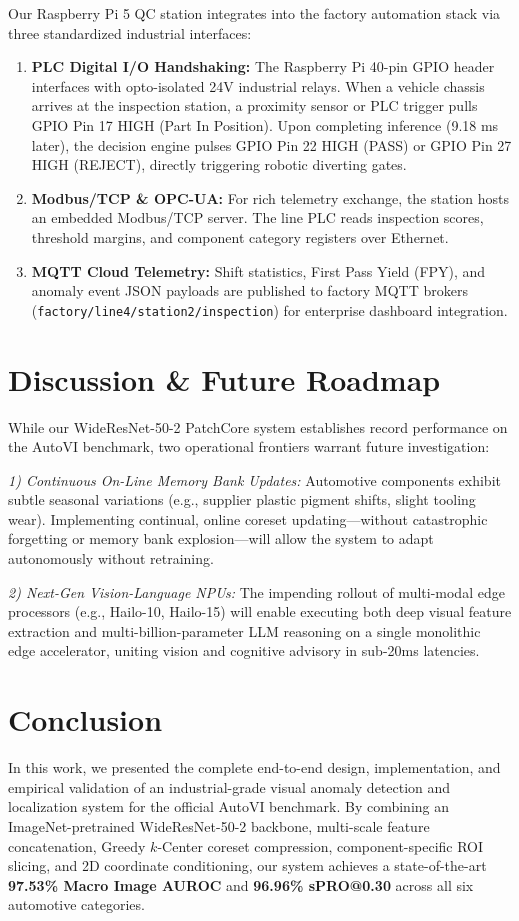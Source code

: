 \documentclass[journal,twocolumn]{IEEEtran}
\begin{document}
Our Raspberry Pi 5 QC station integrates into the factory automation stack via three standardized industrial interfaces:
\begin{enumerate}
    \item \textbf{PLC Digital I/O Handshaking:} The Raspberry Pi 40-pin GPIO header interfaces with opto-isolated 24V industrial relays. When a vehicle chassis arrives at the inspection station, a proximity sensor or PLC trigger pulls GPIO Pin 17 HIGH (Part In Position). Upon completing inference (9.18 ms later), the decision engine pulses GPIO Pin 22 HIGH (PASS) or GPIO Pin 27 HIGH (REJECT), directly triggering robotic diverting gates.
    \item \textbf{Modbus/TCP \& OPC-UA:} For rich telemetry exchange, the station hosts an embedded Modbus/TCP server. The line PLC reads inspection scores, threshold margins, and component category registers over Ethernet.
    \item \textbf{MQTT Cloud Telemetry:} Shift statistics, First Pass Yield (FPY), and anomaly event JSON payloads are published to factory MQTT brokers (\texttt{factory/line4/station2/inspection}) for enterprise dashboard integration.
\end{enumerate}

\section{Discussion & Future Roadmap}
While our WideResNet-50-2 PatchCore system establishes record performance on the AutoVI benchmark, two operational frontiers warrant future investigation:

\textit{1) Continuous On-Line Memory Bank Updates:} Automotive components exhibit subtle seasonal variations (e.g., supplier plastic pigment shifts, slight tooling wear). Implementing continual, online coreset updating---without catastrophic forgetting or memory bank explosion---will allow the system to adapt autonomously without retraining.

\textit{2) Next-Gen Vision-Language NPUs:} The impending rollout of multi-modal edge processors (e.g., Hailo-10, Hailo-15) will enable executing both deep visual feature extraction and multi-billion-parameter LLM reasoning on a single monolithic edge accelerator, uniting vision and cognitive advisory in sub-20ms latencies.

\section{Conclusion}
In this work, we presented the complete end-to-end design, implementation, and empirical validation of an industrial-grade visual anomaly detection and localization system for the official AutoVI benchmark. By combining an ImageNet-pretrained WideResNet-50-2 backbone, multi-scale feature concatenation, Greedy $k$-Center coreset compression, component-specific ROI slicing, and 2D coordinate conditioning, our system achieves a state-of-the-art \textbf{97.53\% Macro Image AUROC} and \textbf{96.96\% sPRO@0.30} across all six automotive categories.
\end{document}
